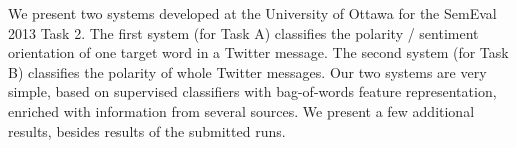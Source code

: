 We present two systems developed at the University of Ottawa for the SemEval 2013 Task 2. The first system (for Task A) classifies the polarity / sentiment
 orientation of one target word in a Twitter message. The second system (for
 Task B) classifies the polarity of whole Twitter messages. Our two systems are
 very simple, based on supervised classifiers with bag-of-words feature
 representation, enriched with information from several sources. We present a
 few additional results, besides results of the submitted runs.


